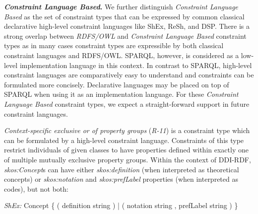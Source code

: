 \documentclass[conference]{IEEEtran}
\begin{document}
\textbf{\emph{Constraint Language Based}.}
We further distinguish \emph{Constraint Language Based} as the set of constraint types that can be expressed by common classical declarative high-level constraint languages like ShEx, ReSh, and DSP. 
There is a strong overlap between \emph{RDFS/OWL} and \emph{Constraint Language Based} constraint types as in many cases constraint types are expressible by both classical constraint languages and RDFS/OWL. SPARQL, however, is considered as a low-level implementation language in this context. In contrast to SPARQL, high-level constraint languages are comparatively easy to understand and constraints can be formulated more concisely. Declarative languages may be placed on top of SPARQL when using it as an implementation language. For these \emph{Constraint Language Based} constraint types, we expect a straight-forward support in future constraint languages.

\emph{Context-specific exclusive or of property groups} (\emph{R-11}) is a constraint type which can be formulated by a high-level constraint language. Constraints of this type restrict individuals of given classes to have properties defined within exactly one of multiple mutually exclusive property groups. Within the context of DDI-RDF, \emph{skos:Concept}s can have either \emph{skos:definition} (when interpreted as theo\-reti\-cal concepts) or \emph{skos:notation} and \emph{skos:prefLabel} properties (when interpreted as codes), but not both:

\begin{ex}[commandchars=\\\{\}]
\textit{ShEx:} Concept \{ 
    ( definition string ) |
    ( notation string , prefLabel string ) \}
\end{ex}

\end{document}
